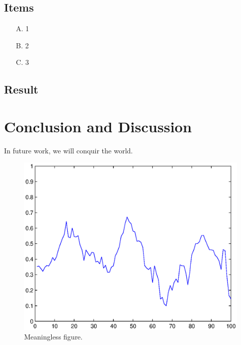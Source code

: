 \documentclass[letterpaper, 10 pt, conference]{IEEEtran}  %
\begin{document}
\subsection{Items}

\begin{itemize}
    \item[A.] 1
    \item[B.] 2
    \item[C.] 3
\end{itemize}


\subsection{Result}



\section{Conclusion and Discussion}
In future work, we will conquir the world.

\begin{figure}[t!]
 \centering
  \includegraphics[width=.49\textwidth]{figure/sample.eps}
  \caption{Meaningless figure.}
 \label{fig:meaningless}
\end{figure}

\end{document}
